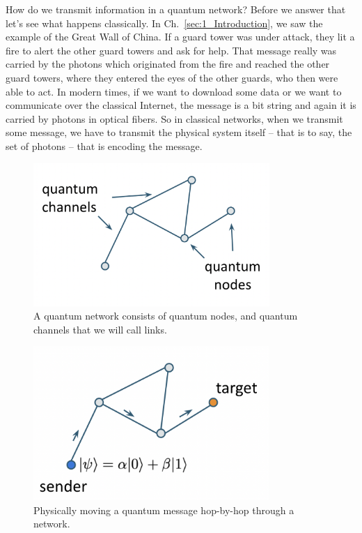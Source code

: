 How do we transmit information in a quantum network? Before we answer that let's see what happens classically. In Ch.~\ref{sec:1_Introduction}, we saw the example of the Great Wall of China. If a guard tower was under attack, they lit a fire to alert the other guard towers and ask for help. That message really was carried by the photons which originated from the fire and reached the other guard towers, where they entered the eyes of the other guards, who then were able to act. In modern times, if we want to download some data or we want to communicate over the classical Internet, the message is a bit string and again it is carried by photons in optical fibers. So in classical networks, when we transmit some message, we have to transmit the physical system itself  -- that is to say, the set of photons -- that is encoding the message.
\begin{figure}[H]
    \centering
    \includegraphics[width=0.8\textwidth]{lesson8/quantum-network.png}
        \caption{A quantum network consists of quantum nodes, and quantum channels that we will call links.}
    \label{fig:quantum-network}
\end{figure}
\begin{figure}[H]
    \centering
    \includegraphics[width=0.8\textwidth]{lesson8/hop-by-hop.png}
        \caption{Physically moving a quantum message hop-by-hop through a network.}
    \label{fig:hop-by-hop}
\end{figure}
